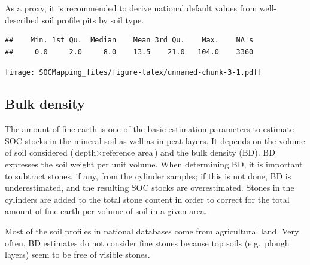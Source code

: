 \documentclass[10pt,b5paper,]{book}
\newenvironment{Shaded}{\begin{snugshade}}{\end{snugshade}}
\newcommand{\CommentTok}[1]{\textcolor[rgb]{0.56,0.35,0.01}{\textit{#1}}}
\newcommand{\DataTypeTok}[1]{\textcolor[rgb]{0.13,0.29,0.53}{#1}}
\newcommand{\DecValTok}[1]{\textcolor[rgb]{0.00,0.00,0.81}{#1}}
\newcommand{\KeywordTok}[1]{\textcolor[rgb]{0.13,0.29,0.53}{\textbf{#1}}}
\newcommand{\NormalTok}[1]{#1}
\newcommand{\OperatorTok}[1]{\textcolor[rgb]{0.81,0.36,0.00}{\textbf{#1}}}
\newcommand{\StringTok}[1]{\textcolor[rgb]{0.31,0.60,0.02}{#1}}
\theoremstyle{definition}
\theoremstyle{definition}
\theoremstyle{definition}
\theoremstyle{remark}
\begin{document}
As a proxy, it is recommended to derive national default values from
well-described soil profile pits by soil type.

\begin{Shaded}
\end{Shaded}

\begin{verbatim}
##    Min. 1st Qu.  Median    Mean 3rd Qu.    Max.    NA's 
##     0.0     2.0     8.0    13.5    21.0   104.0    3360
\end{verbatim}

\begin{Shaded}
\end{Shaded}

\texttt{[image: SOCMapping\_files/figure-latex/unnamed-chunk-3-1.pdf]}

\hypertarget{bulk-density}{%
\subsection{Bulk density}\label{bulk-density}}

The amount of fine earth is one of the basic estimation parameters to
estimate SOC stocks in the mineral soil as well as in peat layers. It
depends on the volume of soil considered
(\(\text{depth} \times \text{reference area}\)) and the bulk density
(BD). BD expresses the soil weight per unit volume. When determining BD,
it is important to subtract stones, if any, from the cylinder samples;
if this is not done, BD is underestimated, and the resulting SOC stocks
are overestimated. Stones in the cylinders are added to the total stone
content in order to correct for the total amount of fine earth per
volume of soil in a given area.

Most of the soil profiles in national databases come from agricultural
land. Very often, BD estimates do not consider fine stones because top
soils (e.g.~plough layers) seem to be free of visible stones.
\end{document}
